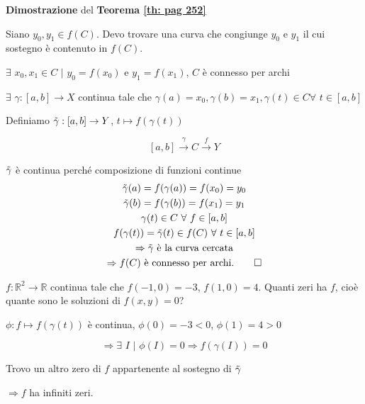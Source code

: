 	
\begin{dembar}
	\textbf{Dimostrazione} del \textbf{Teorema \ref{th: pag 252}}
	
	Siano $y_0,y_1 \in f(C)$. Devo trovare una curva che congiunge $y_0$ e $y_1$ il cui sostegno è contenuto in $f(C)$. 
	
	$\exists \,\, x_0,x_1 \in C\,\, \big|\,\, y_0= f(x_0)$ e $y_1=f(x_1)$, $C$ è connesso per archi
	
	$\exists\,\, \gamma:[a,b]\rightarrow X$ continua tale che $\gamma(a)=x_0, \gamma(b)=x_1, \gamma(t)\in C \forall\,\, t \in [a,b]$
	
	Definiamo $\Tilde{\gamma}:[a,b] \rightarrow Y$, $t \mapsto f(\gamma(t))$
	
	$$[a,b]\xrightarrow{\gamma} C \xrightarrow{f}Y$$
	
	$\Tilde{\gamma}$ è continua perché composizione di funzioni continue
	\begin{gather*} 
		\Tilde{\gamma}(a)=f(\gamma(a))=f(x_0)=y_0
		\\
		\Tilde{\gamma}(b)=f(\gamma(b))=f(x_1)=y_1
		\\
		\gamma(t)\in C\,\, \forall\,\, f \in [a,b]
		\\
		f(\gamma(t))=\Tilde{\gamma}(t)\in f(C)\,\,\forall\,\,t \in [a,b]
		\\
		\Rightarrow \Tilde{\gamma} \text{ è la curva cercata}
		\\
		\Rightarrow f(C) \text{ è connesso per archi.} \qquad \square
	\end{gather*}
	
	\segnaposto
\end{dembar}
	
	
\begin{exbar}
	$f:\mathbb{R}^2\rightarrow \mathbb{R}$ continua tale che $f(-1,0)=-3$, $f(1,0)=4$. Quanti zeri ha $f$, cioè quante sono le soluzioni di $f(x,y)=0$?
	
	\segnaposto
	
	{\color{blue}$\phi : f \mapsto f(\gamma(t))$ è continua, $\phi(0)=-3 <0$, $\phi(1)=4 >0$
	
	$$\Rightarrow \exists\,\, I\,\, \big| \,\, \phi(I)=0 \Rightarrow f(\gamma(I))=0$$
	
	Trovo un altro zero di $f$ appartenente al sostegno di $\Tilde{\gamma}$} 
	
	\begin{center} $\Rightarrow f$ ha infiniti zeri. \end{center} 
\end{exbar}	
